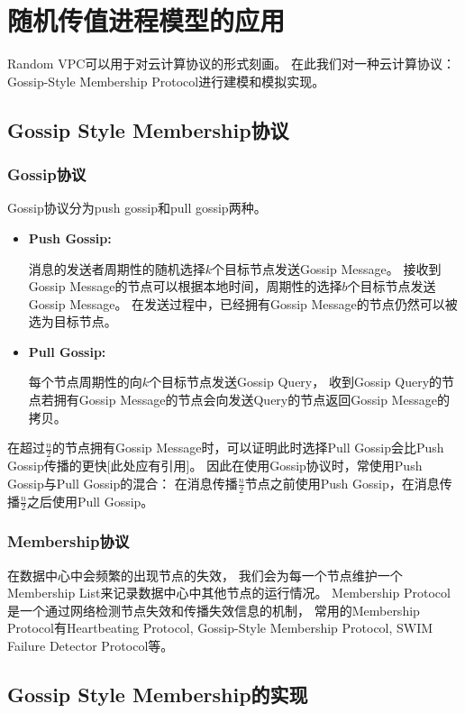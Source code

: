 
\chapter{随机传值进程模型的应用}

Random VPC可以用于对云计算协议的形式刻画。
在此我们对一种云计算协议：Gossip-Style Membership Protocol进行建模和模拟实现。

\section{Gossip Style Membership协议}
\subsection{Gossip协议}
Gossip协议分为push gossip和pull gossip两种。
\begin{itemize}
   \item {
      \textbf{Push Gossip:} 
      
      消息的发送者周期性的随机选择$k$个目标节点发送Gossip Message。
      接收到Gossip Message的节点可以根据本地时间，周期性的选择$b$个目标节点发送Gossip Message。
      在发送过程中，已经拥有Gossip Message的节点仍然可以被选为目标节点。
   }
   \item {
      \textbf{Pull Gossip:}

      每个节点周期性的向$k$个目标节点发送Gossip Query，
      收到Gossip Query的节点若拥有Gossip Message的节点会向发送Query的节点返回Gossip Message的拷贝。
   }
\end{itemize}

在超过$\frac{n}{2}$的节点拥有Gossip Message时，可以证明此时选择Pull Gossip会比Push Gossip传播的更快[此处应有引用]。
因此在使用Gossip协议时，常使用Push Gossip与Pull Gossip的混合：
在消息传播$\frac{n}{2}$节点之前使用Push Gossip，在消息传播$\frac{n}{2}$之后使用Pull Gossip。

\subsection{Membership协议}

在数据中心中会频繁的出现节点的失效，
我们会为每一个节点维护一个Membership List来记录数据中心中其他节点的运行情况。
Membership Protocol是一个通过网络检测节点失效和传播失效信息的机制，
常用的Membership Protocol有Heartbeating Protocol, Gossip-Style Membership Protocol, SWIM Failure Detector Protocol等。

\section{Gossip Style Membership的实现}
